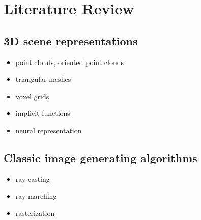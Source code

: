 \chapter{Literature Review}\label{chapter:lit}

\section{3D scene representations}
\label{lit:classic-repr}
\begin{itemize}
	\item point clouds, oriented point clouds
	\item triangular meshes
	\item voxel grids
	\item implicit functions
	\item neural representation
\end{itemize}

\section{Classic image generating algorithms}
\label{lit:classic-algo}
\begin{itemize}
	\item ray casting 
	\item ray marching
	\item rasterization
\end{itemize}


